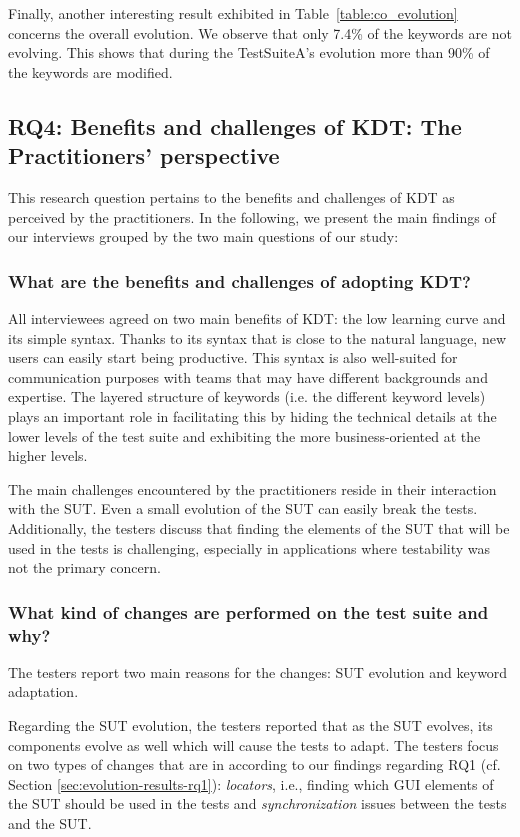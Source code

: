 Finally, another interesting result exhibited in Table~\ref{table:co_evolution} concerns the overall evolution. We observe that only 7.4\% of the keywords are not evolving. This shows that during the TestSuiteA's evolution more than 90\% of the keywords are modified.

\subsection{RQ4: Benefits and challenges of KDT: The Practitioners' perspective}
\label{sec:evolution-results-rq4}

This research question pertains to the benefits and challenges of KDT as perceived by the practitioners. In the following, we present the main findings of our interviews grouped by the two main questions of our study:

\subsubsection{What are the benefits and challenges of adopting KDT?}

All interviewees agreed on two main benefits of KDT: the low learning curve and its simple syntax. Thanks to its syntax that is close to the natural language, new users can easily start being productive.  This syntax is also well-suited for communication purposes with teams that may have different backgrounds and expertise. The layered structure of keywords (i.e. the different keyword levels) plays an important role in facilitating this by hiding the technical details at the lower levels of the test suite and exhibiting the more business-oriented at the higher levels.

The main challenges encountered by the practitioners reside in their interaction with the SUT. Even a small evolution of the SUT can easily break the tests. Additionally, the testers discuss that finding the elements of the SUT that will be used in the tests is challenging, especially in applications where testability was not the primary concern.

\subsubsection{What kind of changes are performed on the test suite and why?}

The testers report two main reasons for the changes: SUT evolution and keyword adaptation.

Regarding the SUT evolution, the testers reported that as the SUT evolves, its components evolve as well which will cause the tests to adapt. The testers focus on two types of changes that are in according to our findings regarding RQ1 (cf. Section \ref{sec:evolution-results-rq1}): \emph{locators}, i.e., finding which GUI elements of the SUT should be used in the tests and \emph{synchronization} issues between the tests and the SUT.

